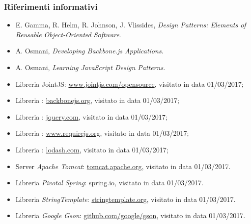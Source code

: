 \subsubsection{Riferimenti informativi}
\begin{itemize}
	\item E. Gamma, R. Helm, R. Johnson, J. Vlissides, \emph{Design Patterns: Elements of Reusable Object-Oriented Software}.
	\item A. Osmani, \emph{Developing Backbone.js Applications}.
	\item A. Osmani, \emph{Learning JavaScript Design Patterns}.
	\item Libreria JointJS: \url{www.jointjs.com/opensource}, visitato in data 01/03/2017;
	\item Libreria \backbonejs: \url{backbonejs.org}, visitato in data 01/03/2017;
	\item Libreria \jquery: \url{jquery.com}, visitato in data 01/03/2017;
	\item Libreria \requirejs: \url{www.requirejs.org}, visitato in data 01/03/2017;
	\item Libreria \lodash: \url{lodash.com}, visitato in data 01/03/2017;
	\item Server \emph{Apache Tomcat}: \url{tomcat.apache.org}, visitato in data 01/03/2017.
	\item Libreria \emph{Pivotal Spring}: \url{spring.io}, visitato in data 01/03/2017.
	\item Libreria \emph{StringTemplate}: \url{stringtemplate.org}, visitato in data 01/03/2017.
	\item Libreria \emph{Google Gson}: \url{github.com/google/gson}, visitato in data 01/03/2017.
\end{itemize}
